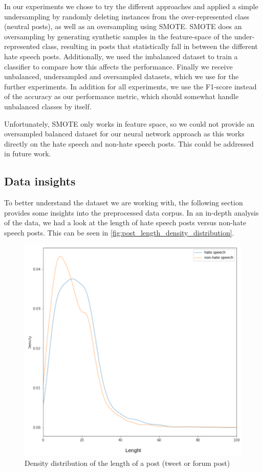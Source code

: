 In our experiments we chose to try the different approaches and applied a simple undersampling by randomly deleting instances from the over-represented class (neutral posts), as well as an oversampling using SMOTE. SMOTE does an oversampling by generating synthetic samples in the feature-space of the under-represented class, resulting in posts that statistically fall in between the different hate speech posts. Additionally, we used the imbalanced dataset to train a classifier to compare how this affects the performance.
Finally we receive unbalanced, undersampled and oversampled datasets, which we use for the further experiments. In addition for all experiments, we use the F1-score instead of the accuracy as our performance metric, which should somewhat handle unbalanced classes by itself.

Unfortunately, SMOTE only works in feature space, so we could not provide an oversampled balanced dataset for our neural network approach as this works directly on the hate speech and non-hate speech posts. This could be addressed in future work.

\subsection{Data insights} \label{sec:data_insights}

To better understand the dataset we are working with, the following section provides some insights into the preprocessed data corpus.
In an in-depth analysis of the data, we had a look at the length of hate speech posts versus non-hate speech posts. This can be seen in \autoref{fig:post_length_density_distribution}.

\begin{figure}[ht]
    \centering
    \includegraphics[width=0.8\linewidth]{figures/post_length_density_distribution.png}
    \caption{Density distribution of the length of a post (tweet or forum post)}
    \label{fig:post_length_density_distribution}
\end{figure}

